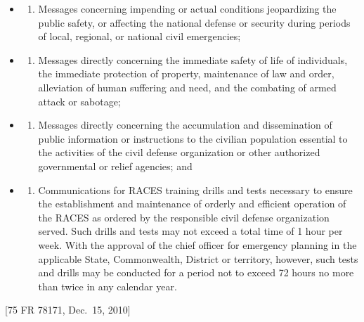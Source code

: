 \documentclass[
  letterpaper,
  DIV=11,
  numbers=noendperiod]{scrreport}
\providecommand{\tightlist}{%
  \setlength{\itemsep}{0pt}\setlength{\parskip}{0pt}}\usepackage{longtable,booktabs,array}
\begin{document}
\begin{itemize}
\item
  \begin{enumerate}
  \def\labelenumi{(\arabic{enumi})}
  \tightlist
  \item
    Messages concerning impending or actual conditions jeopardizing the
    public safety, or affecting the national defense or security during
    periods of local, regional, or national civil emergencies;
  \end{enumerate}
\item
  \begin{enumerate}
  \def\labelenumi{(\arabic{enumi})}
  \setcounter{enumi}{1}
  \tightlist
  \item
    Messages directly concerning the immediate safety of life of
    individuals, the immediate protection of property, maintenance of
    law and order, alleviation of human suffering and need, and the
    combating of armed attack or sabotage;
  \end{enumerate}
\item
  \begin{enumerate}
  \def\labelenumi{(\arabic{enumi})}
  \setcounter{enumi}{2}
  \tightlist
  \item
    Messages directly concerning the accumulation and dissemination of
    public information or instructions to the civilian population
    essential to the activities of the civil defense organization or
    other authorized governmental or relief agencies; and
  \end{enumerate}
\item
  \begin{enumerate}
  \def\labelenumi{(\arabic{enumi})}
  \setcounter{enumi}{3}
  \tightlist
  \item
    Communications for RACES training drills and tests necessary to
    ensure the establishment and maintenance of orderly and efficient
    operation of the RACES as ordered by the responsible civil defense
    organization served. Such drills and tests may not exceed a total
    time of 1 hour per week. With the approval of the chief officer for
    emergency planning in the applicable State, Commonwealth, District
    or territory, however, such tests and drills may be conducted for a
    period not to exceed 72 hours no more than twice in any calendar
    year.
  \end{enumerate}
\end{itemize}

{[}75 FR 78171, Dec.~15, 2010{]}
\end{document}
